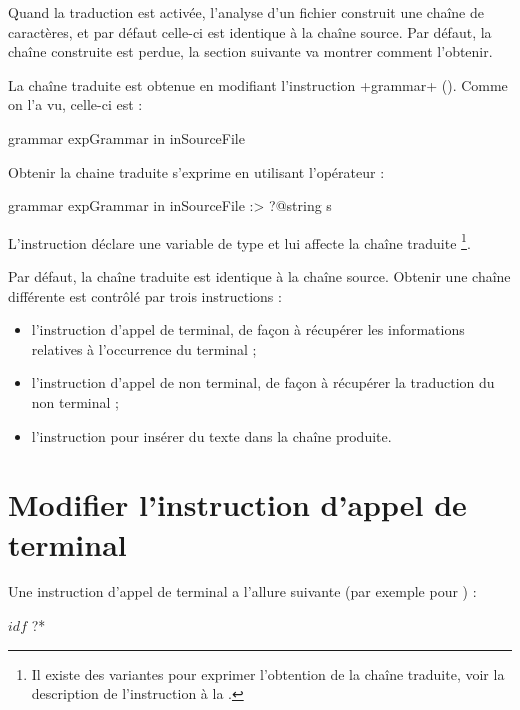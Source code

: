 Quand la traduction est activée, l'analyse d'un fichier construit une chaîne de caractères, et par défaut celle-ci est identique à la chaîne source. Par défaut, la chaîne construite est perdue, la section suivante va montrer comment l'obtenir.









La chaîne traduite est obtenue en modifiant l'instruction \ggs+grammar+ (). Comme on l'a vu, celle-ci est : 
\begin{galgascode}
grammar expGrammar in inSourceFile
\end{galgascode}

Obtenir la chaine traduite s'exprime en utilisant l'opérateur  \galgas{\:>} :
\begin{galgascode}
grammar expGrammar in inSourceFile :> ?@string s
\end{galgascode}

L'instruction déclare une variable  de type  et lui affecte la chaîne traduite \footnote{Il existe des variantes pour exprimer l'obtention de la chaîne traduite, voir la description de l'instruction  à la .}.

Par défaut, la chaîne traduite est identique à la chaîne source. Obtenir une chaîne différente est contrôlé par trois instructions :
\begin{itemize}
  \item l'instruction d'appel de terminal, de façon à récupérer les informations relatives à l'occurrence du terminal ;
  \item l'instruction d'appel de non terminal, de façon à récupérer la traduction du non terminal ;
  \item l'instruction  pour insérer du texte dans la chaîne produite.
\end{itemize}







\section{Modifier l'instruction d'appel de terminal}

Une instruction d'appel de terminal a l'allure suivante (par exemple pour ) :
\begin{galgascode}
$idf$ ?*
\end{galgascode}

